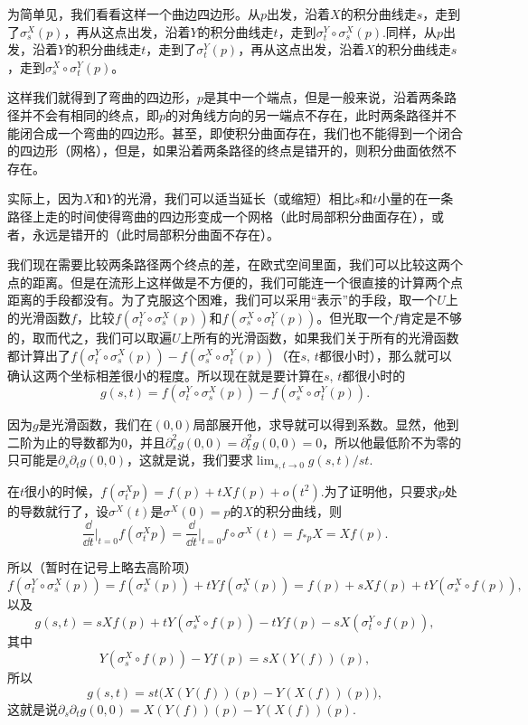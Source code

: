 为简单见，我们看看这样一个曲边四边形。从$p$出发，沿着$X$的积分曲线走$s$，走到了$\sigma^X_s(p)$，再从这点出发，沿着$Y$的积分曲线走$t$，走到$\sigma^Y_t\circ\sigma^X_s(p)$.同样，从$p$出发，沿着$Y$的积分曲线走$t$，走到了$\sigma^Y_t(p)$，再从这点出发，沿着$X$的积分曲线走$s$，走到$\sigma^X_s\circ\sigma^Y_t(p)$。

这样我们就得到了弯曲的四边形，$p$是其中一个端点，但是一般来说，沿着两条路径并不会有相同的终点，即$p$的对角线方向的另一端点不存在，此时两条路径并不能闭合成一个弯曲的四边形。甚至，即使积分曲面存在，我们也不能得到一个闭合的四边形（网格），但是，如果沿着两条路径的终点是错开的，则积分曲面依然不存在。

实际上，因为$X$和$Y$的光滑，我们可以适当延长（或缩短）相比$s$和$t$小量的在一条路径上走的时间使得弯曲的四边形变成一个网格（此时局部积分曲面存在），或者，永远是错开的（此时局部积分曲面不存在）。

我们现在需要比较两条路径两个终点的差，在欧式空间里面，我们可以比较这两个点的距离。但是在流形上这样做是不方便的，我们可能连一个很直接的计算两个点距离的手段都没有。为了克服这个困难，我们可以采用“表示”的手段，取一个$U$上的光滑函数$f$，比较$f(\sigma^Y_t\circ\sigma^X_s(p))$和$f(\sigma^X_s\circ\sigma^Y_t(p))$。但光取一个$f$肯定是不够的，取而代之，我们可以取遍$U$上所有的光滑函数，如果我们关于所有的光滑函数都计算出了$f(\sigma^Y_t\circ\sigma^X_s(p))-f(\sigma^X_s\circ\sigma^Y_t(p))$（在$s$, $t$都很小时），那么就可以确认这两个坐标相差很小的程度。所以现在就是要计算在$s$, $t$都很小时的
\[
	g(s,t)=f(\sigma^Y_t\circ\sigma^X_s(p))-f(\sigma^X_s\circ\sigma^Y_t(p)).
\]

因为$g$是光滑函数，我们在$(0,0)$局部展开他，求导就可以得到系数。显然，他到二阶为止的导数都为$0$，并且$\partial_s^2g(0,0)=\partial_t^2g(0,0)=0$，所以他最低阶不为零的只可能是$\partial_s\partial_t g(0,0)$，这就是说，我们要求$\lim_{s,t\to 0}g(s,t)/st$.

\para 在$t$很小的时候，$f(\sigma_t^X p)=f(p)+tXf(p)+o(t^2)$.为了证明他，只要求$p$处的导数就行了，设$\sigma^X(t)$是$\sigma^X(0)=p$的$X$的积分曲线，则
	\[
		\frac{\dd}{\dd t}\biggr|_{t=0}f(\sigma_t^X p)=\frac{\dd}{\dd t}\biggr|_{t=0}f\circ \sigma^X (t)=f_{* p}X=Xf(p).
	\]

所以（暂时在记号上略去高阶项）
\[
	f(\sigma^Y_t\circ\sigma^X_s(p))=f(\sigma^X_s(p))+tYf(\sigma^X_s(p))=f(p)+sXf(p)+tY(\sigma^X_s\circ f(p)),
\]
以及
\[
	g(s,t)=sXf(p)+tY(\sigma^X_s\circ f(p))-tYf(p)-sX(\sigma^Y_t\circ f(p)),
\]
其中
\[
	Y(\sigma^X_s\circ f(p))-Yf(p)=sX(Y(f))(p),
\]
所以
\[
	g(s,t)=st\bigl(X(Y(f))(p)-Y(X(f))(p)\bigr),
\]
这就是说$\partial_s\partial_t g(0,0)=X(Y(f))(p)-Y(X(f))(p)$.

